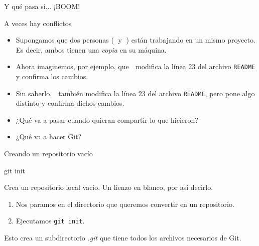 \begin{frame}[t]{Y qué pasa si... ¡BOOM!}

    \begin{block}{A veces hay conflictos}
        \begin{itemize}
            \item Supongamos que dos personas (👨 y 👩) están trabajando en un mismo proyecto.
                Es decir, ambos tienen una \textit{copia} en su máquina.
            \pause
            \item Ahora imaginemos, por ejemplo, que 👨 modifica la línea 23 del archivo \texttt{README}
                y confirma los cambios.
            \pause
            \item Sin saberlo, 👩 también modifica la línea 23 del archivo \texttt{README}, pero pone algo distinto y confirma dichos cambios.
            \pause
            \item ¿Qué va a pasar cuando quieran compartir lo que hicieron?\\ 
            \pause
            \item ¿Qué va a hacer Git?\\ 
        \end{itemize}
    \end{block}

\end{frame}

\begin{frame}[t]{Creando un repositorio vacío}
    \begin{comando}
        git init
    \end{comando}

    \pause
    \begin{block}{}
        Crea un repositorio local vacío. Un lienzo en blanco, por así decirlo.
        \begin{enumerate}
            \item Nos paramos en el directorio que queremos convertir en un repositorio.
            \item Ejecutamos \texttt{git init}.
        \end{enumerate}
        Esto crea un subdirectorio \textit{.git} que tiene todos los archivos necesarios de Git.
    \end{block}
\end{frame}

